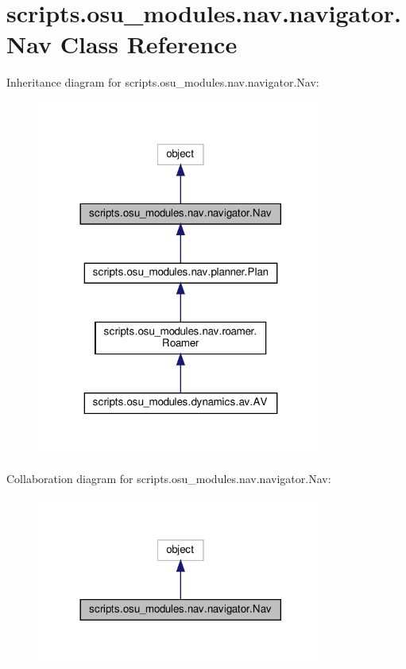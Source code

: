 \hypertarget{classscripts_1_1osu__modules_1_1nav_1_1navigator_1_1Nav}{}\section{scripts.\+osu\+\_\+modules.\+nav.\+navigator.\+Nav Class Reference}
\label{classscripts_1_1osu__modules_1_1nav_1_1navigator_1_1Nav}


Inheritance diagram for scripts.\+osu\+\_\+modules.\+nav.\+navigator.\+Nav\+:\nopagebreak
\begin{figure}[H]
\begin{center}
\leavevmode
\includegraphics[width=269pt]{d2/d48/classscripts_1_1osu__modules_1_1nav_1_1navigator_1_1Nav__inherit__graph}
\end{center}
\end{figure}


Collaboration diagram for scripts.\+osu\+\_\+modules.\+nav.\+navigator.\+Nav\+:\nopagebreak
\begin{figure}[H]
\begin{center}
\leavevmode
\includegraphics[width=269pt]{d0/d22/classscripts_1_1osu__modules_1_1nav_1_1navigator_1_1Nav__coll__graph}
\end{center}
\end{figure}
